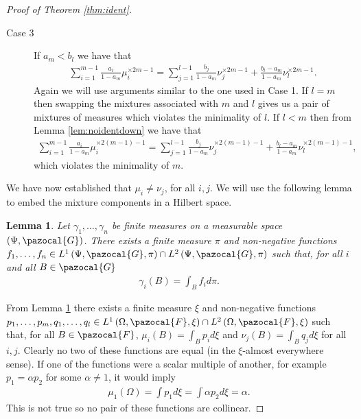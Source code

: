 \documentclass[aos,preprint]{imsart}
\def\sF{\pazocal{F}}
\def\sG{\pazocal{G}}
\theoremstyle{plain}
\newtheorem{lem}{Lemma}[section]
\theoremstyle{defintion}
\begin{document}
\begin{proof}[Proof of Theorem \ref{thm:ident}]
\begin{description}
			\item[Case 3] If $a_m<b_l$ we have that
				\begin{eqnarray*}
					\sum_{i=1}^{m-1} \frac{a_i}{1-a_m} \mu_i^{\times 2m-1} = \sum_{j=1}^{l-1} \frac{b_j}{1-a_m} \nu_{j}^{\times 2m-1} + \frac{b_l - a_m}{1-a_m} \nu_l^{\times 2m-1}.
				\end{eqnarray*}
				Again we will use arguments similar to the one used in Case 1. If $l=m$ then swapping the mixtures associated with $m$ and $l$ gives us a pair of mixtures of measures which violates the minimality of $l$. If $l<m$ then from Lemma \ref{lem:noidentdown} we have that
				\begin{eqnarray*}
					\sum_{i=1}^{m-1} \frac{a_i}{1-a_m} \mu_i^{\times 2(m-1)-1} = \sum_{j=1}^{l-1} \frac{b_j}{1-a_m} \nu_{j}^{\times 2(m-1)-1} + \frac{b_l - a_m}{1-a_m} \nu_l^{\times 2(m-1)-1},
				\end{eqnarray*}
				which violates the minimality of $m$.
		\end{description}

		We have now established that $\mu_i \neq \nu_j$, for all $i,j$.
		We will use the following lemma to embed the mixture components in a Hilbert space.
		\begin{lem} \label{lem:himbed}
			Let $\gamma_1,\ldots,\gamma_n$ be finite measures on a measurable space $\left( \Psi, \sG \right)$. There exists a finite measure $\pi$ and non-negative functions $f_1,\ldots,f_n \in  L^1\left( \Psi,\sG,\pi \right)\cap L^2\left( \Psi,\sG,\pi \right)$ such that, for all $i$ and all $B \in \sG$
			\begin{eqnarray*}
				\gamma_i(B)=\int_B f_i d\pi. 
			\end{eqnarray*}
		\end{lem}
		From Lemma \ref{lem:himbed} there exists a finite measure $\xi$ and non-negative functions $p_1,\ldots,p_m,q_1,\ldots,q_l \in L^1\left( \Omega, \sF, \xi \right)\cap L^2\left( \Omega, \sF, \xi \right)$ such that, for all $B\in \sF$, $\mu_i(B) = \int_B p_i d\xi$ and $\nu_j(B) = \int_B q_j d\xi$ for all $i,j$. Clearly no two of these functions are equal (in the $\xi$-almost everywhere sense). If one of the functions were a scalar multiple of another, for example $p_1 = \alpha p_2$ for some $\alpha \neq 1$, it would imply
		\begin{eqnarray*}
			\mu_1\left( \Omega \right) = \int p_1 d\xi = \int \alpha p_2 d\xi=\alpha.
		\end{eqnarray*}
		This is not true so no pair of these functions are collinear.


\end{proof}
\end{document}
